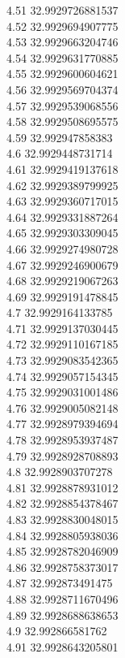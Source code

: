 {4.51	32.9929726881537\\
4.52	32.9929694907775\\
4.53	32.9929663204746\\
4.54	32.9929631770885\\
4.55	32.9929600604621\\
4.56	32.9929569704374\\
4.57	32.9929539068556\\
4.58	32.9929508695575\\
4.59	32.992947858383\\
4.6	32.9929448731714\\
4.61	32.9929419137618\\
4.62	32.9929389799925\\
4.63	32.9929360717015\\
4.64	32.9929331887264\\
4.65	32.9929303309045\\
4.66	32.9929274980728\\
4.67	32.9929246900679\\
4.68	32.9929219067263\\
4.69	32.9929191478845\\
4.7	32.9929164133785\\
4.71	32.9929137030445\\
4.72	32.9929110167185\\
4.73	32.9929083542365\\
4.74	32.9929057154345\\
4.75	32.9929031001486\\
4.76	32.9929005082148\\
4.77	32.9928979394694\\
4.78	32.9928953937487\\
4.79	32.9928928708893\\
4.8	32.9928903707278\\
4.81	32.9928878931012\\
4.82	32.9928854378467\\
4.83	32.9928830048015\\
4.84	32.9928805938036\\
4.85	32.9928782046909\\
4.86	32.9928758373017\\
4.87	32.992873491475\\
4.88	32.9928711670496\\
4.89	32.9928688638653\\
4.9	32.992866581762\\
4.91	32.9928643205801\\
}
